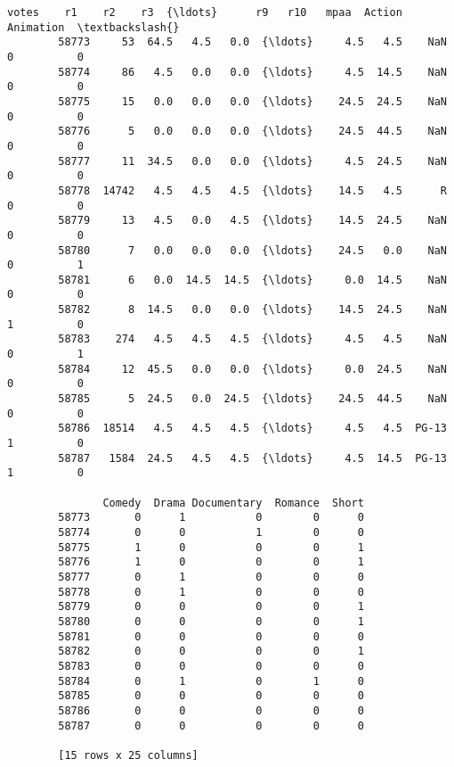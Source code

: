 \documentclass[11pt]{article}
\begin{document}
\begin{Verbatim}[commandchars=\\\{\}]
               votes    r1    r2    r3  {\ldots}      r9   r10   mpaa  Action  Animation  \textbackslash{}
        58773     53  64.5   4.5   0.0  {\ldots}     4.5   4.5    NaN       0          0   
        58774     86   4.5   0.0   0.0  {\ldots}     4.5  14.5    NaN       0          0   
        58775     15   0.0   0.0   0.0  {\ldots}    24.5  24.5    NaN       0          0   
        58776      5   0.0   0.0   0.0  {\ldots}    24.5  44.5    NaN       0          0   
        58777     11  34.5   0.0   0.0  {\ldots}     4.5  24.5    NaN       0          0   
        58778  14742   4.5   4.5   4.5  {\ldots}    14.5   4.5      R       0          0   
        58779     13   4.5   0.0   4.5  {\ldots}    14.5  24.5    NaN       0          0   
        58780      7   0.0   0.0   0.0  {\ldots}    24.5   0.0    NaN       0          1   
        58781      6   0.0  14.5  14.5  {\ldots}     0.0  14.5    NaN       0          0   
        58782      8  14.5   0.0   0.0  {\ldots}    14.5  24.5    NaN       1          0   
        58783    274   4.5   4.5   4.5  {\ldots}     4.5   4.5    NaN       0          1   
        58784     12  45.5   0.0   0.0  {\ldots}     0.0  24.5    NaN       0          0   
        58785      5  24.5   0.0  24.5  {\ldots}    24.5  44.5    NaN       0          0   
        58786  18514   4.5   4.5   4.5  {\ldots}     4.5   4.5  PG-13       1          0   
        58787   1584  24.5   4.5   4.5  {\ldots}     4.5  14.5  PG-13       1          0   
        
               Comedy  Drama Documentary  Romance  Short  
        58773       0      1           0        0      0  
        58774       0      0           1        0      0  
        58775       1      0           0        0      1  
        58776       1      0           0        0      1  
        58777       0      1           0        0      0  
        58778       0      1           0        0      0  
        58779       0      0           0        0      1  
        58780       0      0           0        0      1  
        58781       0      0           0        0      0  
        58782       0      0           0        0      1  
        58783       0      0           0        0      0  
        58784       0      1           0        1      0  
        58785       0      0           0        0      0  
        58786       0      0           0        0      0  
        58787       0      0           0        0      0  
        
        [15 rows x 25 columns]
\end{Verbatim}
            
\end{document}
